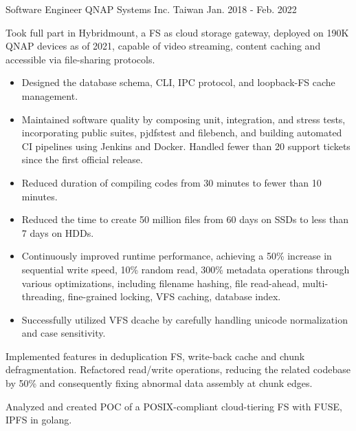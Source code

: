 \begin{cventries}
  \cventry
    {Software Engineer} %
    {QNAP Systems Inc.} %
    {Taiwan} %
    {Jan. 2018 - Feb. 2022} %
    {
      \begin{cvitems} %
        \item Took full part in Hybridmount, a FS as cloud storage gateway,
          deployed on 190K QNAP devices as of 2021, capable of video streaming,
          content caching and accessible via file-sharing protocols.
        \begin{itemize}
          \item Designed the database schema, CLI, IPC protocol, and loopback-FS
            cache management.
          \item Maintained software quality by composing unit, integration, and
            stress tests, incorporating public suites, pjdfstest and filebench,
            and building automated CI pipelines using Jenkins and Docker.
            Handled fewer than 20 support tickets since the first official
            release.
          \item Reduced duration of compiling codes from 30 minutes to fewer
            than 10 minutes.
          \item Reduced the time to create 50 million files from 60 days
            on SSDs to less than 7 days on HDDs.
          \item Continuously improved runtime performance, achieving a 50\%
            increase in sequential write speed, 10\% random read, 300\% metadata
            operations through various optimizations, including filename
            hashing, file read-ahead, multi-threading, fine-grained locking, VFS
            caching, database index.
          \item Successfully utilized VFS dcache by carefully handling unicode
            normalization and case sensitivity.
        \end{itemize}
        \item Implemented features in deduplication FS, write-back cache
          and chunk defragmentation. Refactored read/write operations, reducing
          the related codebase by 50\% and consequently fixing abnormal data
          assembly at chunk edges.
        \item Analyzed and created POC of a POSIX-compliant cloud-tiering FS
          with FUSE, IPFS in golang.
      \end{cvitems}
    }

\end{cventries}

